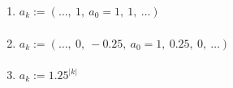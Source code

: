 \documentclass[a4paper,11pt,notitlepage,fullpage]{article}
\begin{document}
\begin{enumerate}
\begin{enumerate}
\item $a_k := (\ldots, ~1, ~a_0=1,  ~1, ~\ldots)$
\begin{align*}
\end{align*}

\item $a_k := (\ldots, ~0, ~-0.25, ~a_0=1, ~0.25, ~0, ~\ldots)$
\begin{align*}
\end{align*}

\item $a_k := 1.25^{|k|}$
\begin{align*}
\end{align*}
\end{enumerate}


\end{enumerate}
\end{document}
